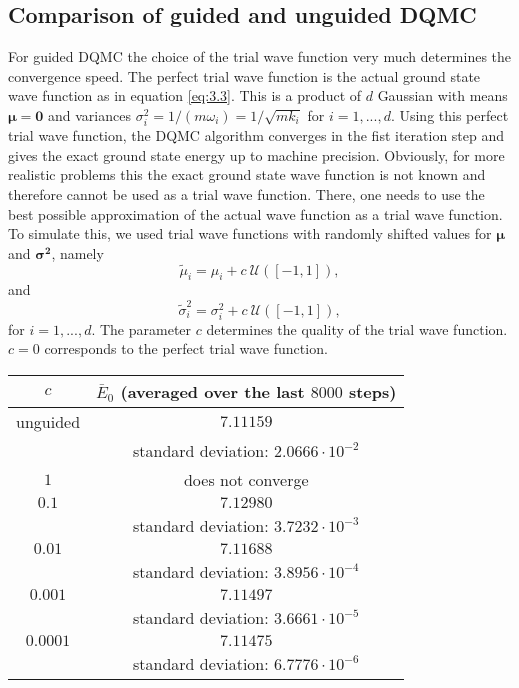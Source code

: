 \documentclass [12pt]{report}
\begin{document}
\subsection{Comparison of guided and unguided DQMC}
For guided DQMC the choice of the trial wave function very much determines the convergence speed. The perfect trial wave function is the actual ground state wave function as in equation \eqref{eq:3.3}. This is a product of $d$ Gaussian with means $\bm{\mu} = \bm{0}$ and variances $\sigma_i^2 = 1/(m \omega_i) = 1/\sqrt{m k_i}$ for $i=1,...,d$. Using this perfect trial wave function, the DQMC algorithm converges in the fist iteration step and gives the exact ground state energy up to machine precision. Obviously, for more realistic problems this the exact ground state wave function is not known  and therefore cannot be used as a trial wave function. There, one needs to use the best possible approximation of the actual wave function as a trial wave function. To simulate this, we used trial wave functions with randomly shifted values for $\bm{\mu}$ and $\bm{\sigma^2}$, namely
\begin{equation}\label{eq:3.4} 
\tilde{\mu}_i = \mu_i + c \: \mathcal{U}([-1,1]),
\end{equation}
and
\begin{equation}\label{eq:3.5} 
\tilde{\sigma}_i^2 = \sigma_i^2 + c \: \mathcal{U}([-1,1]),
\end{equation}
for $i=1,...,d$. The parameter $c$ determines the quality of the trial wave function. $c = 0$ corresponds to the perfect trial wave function.
\begin{center}
 \begin{tabular}{||c | c||} 
 \hline
 $c$ & $\bar{E}_0$ (averaged over the last $8000$ steps) \\ [0.5ex] 
 \hline\hline
 unguided & $7.11159$ \\
  	& standard deviation: $2.0666 \cdot 10^{-2}$\\
  \hline
 $1$ & does not converge \\
 \hline
 $0.1$ & $7.12980$ \\
 	& standard deviation: $3.7232 \cdot 10^{-3}$\\
 \hline
 $0.01$ & $7.11688$ \\
  	& standard deviation: $3.8956 \cdot 10^{-4}$\\
 \hline
 $0.001$ & $7.11497$ \\
  	& standard deviation: $3.6661 \cdot 10^{-5}$\\
 \hline
 $0.0001$ & $7.11475$ \\
   	& standard deviation: $6.7776 \cdot 10^{-6}$\\
 \hline
\end{tabular}
\end{center}
\end{document}
